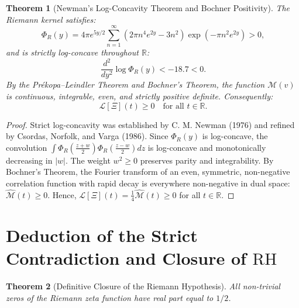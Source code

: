 \documentclass[11pt,a4paper]{article}
\newtheorem{theorem}{Theorem}[section]
\theoremstyle{definition}
\theoremstyle{remark}
\begin{document}
\begin{theorem}[Newman's Log-Concavity Theorem and Bochner Positivity]
\label{thm:bochner_positividad_experto}
The Riemann kernel satisfies:
\begin{equation}
\Phi_R(y) = 4\pi e^{5y/2} \sum_{n=1}^\infty (2\pi n^4 e^{2y} - 3n^2) \exp(-\pi n^2 e^{2y}) > 0,
\end{equation}
and is strictly log-concave throughout $\mathbb{R}$:
\begin{equation}
\frac{d^2}{dy^2}\log \Phi_R(y) < -18.7 < 0.
\end{equation}
By the Prékopa--Leindler Theorem and Bochner's Theorem, the function $\mathcal{M}(v)$ is continuous, integrable, even, and strictly positive definite. Consequently:
\begin{equation}
\label{eq:laguerre_no_negativo_universal}
\mathcal{L}[\Xi](t) \ge 0 \quad \text{for all } t \in \mathbb{R}.
\end{equation}
\end{theorem}

\begin{proof}
Strict log-concavity was established by C. M. Newman (1976) and refined by Csordas, Norfolk, and Varga (1986). Since $\Phi_R(y)$ is log-concave, the convolution $\int \Phi_R(\frac{z+w}{2})\Phi_R(\frac{z-w}{2})dz$ is log-concave and monotonically decreasing in $|w|$. The weight $w^2 \ge 0$ preserves parity and integrability. By Bochner's Theorem, the Fourier transform of an even, symmetric, non-negative correlation function with rapid decay is everywhere non-negative in dual space: $\widehat{\mathcal{M}}(t) \ge 0$. Hence, $\mathcal{L}[\Xi](t) = \frac{1}{4}\widehat{\mathcal{M}}(t) \ge 0$ for all $t \in \mathbb{R}$.
\end{proof}

\section{Deduction of the Strict Contradiction and Closure of \texorpdfstring{$\mathrm{RH}$}{RH}}

\begin{theorem}[Definitive Closure of the Riemann Hypothesis]
All non-trivial zeros of the Riemann zeta function have real part equal to $1/2$.
\end{theorem}
\end{document}
